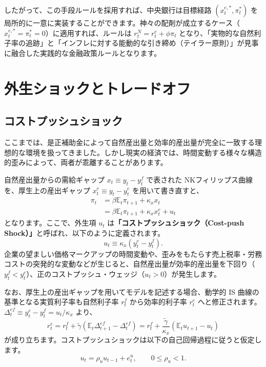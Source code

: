 \documentclass[
  japanese,
  lualatex,
  ja=standard,
  12pt,
  a4paper]{ltjsarticle}
\begin{document}
したがって、この手段ルールを採用すれば、中央銀行は目標経路
\((x_t^{e,*}, \pi_t^*)\)
を局所的に一意に実装することができます。神々の配剤が成立するケース（\(x_t^{e,*}=\pi_t^*=0\)）に適用すれば、ルールは
\(r_t^N = r_t^e + \phi\pi_t\)
となり、「実物的な自然利子率の追跡」と「インフレに対する能動的な引き締め（テイラー原則）」が見事に融合した実践的な金融政策ルールとなります。

\section{外生ショックとトレードオフ}\label{ux5916ux751fux30b7ux30e7ux30c3ux30afux3068ux30c8ux30ecux30fcux30c9ux30aaux30d5}

\subsection{コストプッシュショック}\label{ux30b3ux30b9ux30c8ux30d7ux30c3ux30b7ux30e5ux30b7ux30e7ux30c3ux30af}

ここまでは、是正補助金によって自然産出量と効率的産出量が完全に一致する理想的な環境を扱ってきました。しかし現実の経済では、時間変動する様々な構造的歪みによって、両者が乖離することがあります。

自然産出量からの需給ギャップ \(x_t \equiv y_t - y_t^f\) で表された
NKフィリップス曲線を、厚生上の産出ギャップ \(x_t^e \equiv y_t - y_t^e\)
を用いて書き直すと、 \[
\begin{aligned}
\pi_t
&=
\beta\mathbb{E}_t\pi_{t+1}
+\kappa_x x_t\\
&=
\beta\mathbb{E}_t\pi_{t+1}
+\kappa_x x_t^e+u_t
\end{aligned}
\] となります。ここで、外生項 \(u_t\)
は\textbf{「コストプッシュショック（Cost-push
Shock）」}と呼ばれ、以下のように定義されます。 \[
u_t\equiv\kappa_x(y_t^e-y_t^f).
\]
企業の望ましい価格マークアップの時間変動や、歪みをもたらす売上税率・労務コストの突発的な変動などが生じると、自然産出量が効率的産出量を下回り（\(y_t^f < y_t^e\)）、正のコストプッシュ・ウェッジ（\(u_t>0\)）が発生します。

なお、厚生上の産出ギャップを用いてモデルを記述する場合、動学的 IS
曲線の基準となる実質利子率も自然利子率 \(r_t^f\) から効率的利子率
\(r_t^e\)
へと修正されます。\(\Delta_t^{ef} \equiv y_t^e - y_t^f = u_t/\kappa_x\)
より、 \[
r_t^e
=
r_t^f
+\tilde{\gamma}\left(\mathbb{E}_t \Delta_{t+1}^{ef}-\Delta_t^{ef}\right)
=
r_t^f
+\frac{\tilde{\gamma}}{\kappa_x}\left(\mathbb{E}_t u_{t+1}-u_t\right)
\]
が成り立ちます。コストプッシュショックは以下の自己回帰過程に従うと仮定します。
\[
u_t=\rho_u u_{t-1}+e_t^u,
\qquad
0\leq \rho_u<1.
\]
\end{document}
